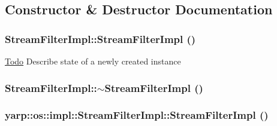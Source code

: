 \subsection{Constructor \& Destructor Documentation}
\hypertarget{classyarp_1_1os_1_1impl_1_1_stream_filter_impl_a34b63ca7d32244a7c0ec974ce7d3c2f2}{
\subsubsection[{StreamFilterImpl}]{\setlength{\rightskip}{0pt plus 5cm}StreamFilterImpl::StreamFilterImpl ()}}
\label{classyarp_1_1os_1_1impl_1_1_stream_filter_impl_a34b63ca7d32244a7c0ec974ce7d3c2f2}
\begin{Desc}
\item[\hyperlink{todo__todo000004}{Todo}]Describe state of a newly created instance \end{Desc}
\hypertarget{classyarp_1_1os_1_1impl_1_1_stream_filter_impl_a57728d60fe69bb2946135cbc817e6400}{
\subsubsection[{$\sim$StreamFilterImpl}]{\setlength{\rightskip}{0pt plus 5cm}StreamFilterImpl::$\sim$StreamFilterImpl ()}}
\label{classyarp_1_1os_1_1impl_1_1_stream_filter_impl_a57728d60fe69bb2946135cbc817e6400}
\hypertarget{classyarp_1_1os_1_1impl_1_1_stream_filter_impl_a9db10175fac8a0e45ecdc03c2c57a5be}{
\subsubsection[{StreamFilterImpl}]{\setlength{\rightskip}{0pt plus 5cm}yarp::os::impl::StreamFilterImpl::StreamFilterImpl ()}}
\label{classyarp_1_1os_1_1impl_1_1_stream_filter_impl_a9db10175fac8a0e45ecdc03c2c57a5be}
